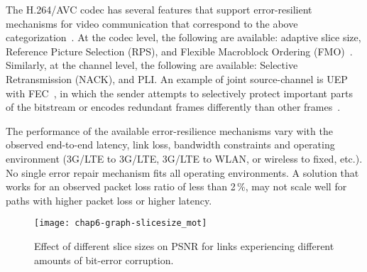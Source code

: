 The H.264/AVC codec has several features that support error-resilient
mechanisms for video communication that correspond to the above
categorization~\cite{310669}. At the codec level, the following are available:
adaptive slice size, Reference Picture Selection (RPS), and Flexible
Macroblock Ordering (FMO)~\cite{err_res_h264_std, wenger_ott_jscc}. Similarly,
at the channel level, the following are available: Selective Retransmission
(NACK), and PLI. An example of joint source-channel is UEP with 
FEC~\cite{wang00review}, in which the sender
attempts to selectively protect important parts of the bitstream or 
encodes redundant frames differently than other frames~\cite{ervcuupkp}.

The performance of the available error-resilience mechanisms vary with the
observed end-to-end latency, link loss, bandwidth constraints and operating
environment (3G/LTE to 3G/LTE, 3G/LTE to WLAN, or wireless to fixed, etc.). No
single error repair mechanism fits all operating environments. A solution that
works for an observed packet loss ratio of less than 2\,\%, may not scale well
for paths with higher packet loss or higher latency.


\begin{figure}
\centerline {
\texttt{[image: chap6-graph-slicesize\_mot]}
}
\caption{Effect of different slice sizes on PSNR for links experiencing different amounts of bit-error corruption.}
\label{fig:slicesize_mot}
\end{figure}

